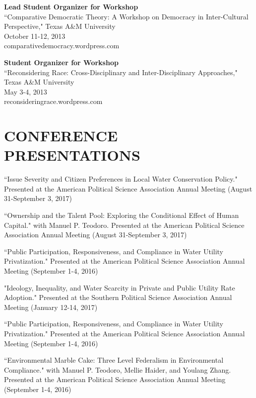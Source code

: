 \documentclass[margin]{res} %
\begin{document}
\begin{resume}
\begin{hangparas}{.25in}{1}
\textbf{Lead Student Organizer for Workshop} \\
``Comparative Democratic Theory: A Workshop on Democracy in Inter-Cultural Perspective," Texas A\&M University\\
October 11-12, 2013 \\
comparativedemocracy.wordpress.com

\textbf{Student Organizer for Workshop} \\
``Reconsidering Race: Cross-Disciplinary and Inter-Disciplinary Approaches," Texas A\&M University\\
May 3-4, 2013 \\
reconsideringrace.wordpress.com \end{hangparas}




\section{CONFERENCE PRESENTATIONS}

 \begin{hangparas}{.25in}{1}

  ``Issue Severity and Citizen Preferences in Local Water Conservation Policy." Presented at the American Political Science Association Annual Meeting (August 31-September 3, 2017)

 ``Ownership and the Talent Pool: Exploring the Conditional Effect of Human Capital." with Manuel P. Teodoro. Presented at the American Political Science Association Annual Meeting (August 31-September 3, 2017)
 
  ``Public Participation, Responsiveness, and Compliance in Water Utility Privatization." Presented at the American Political Science Association Annual Meeting (September 1-4, 2016)

"Ideology, Inequality, and Water Scarcity in Private and Public Utility Rate Adoption." Presented at the Southern Political Science Association Annual Meeting (January 12-14, 2017)

 ``Public Participation, Responsiveness, and Compliance in Water Utility Privatization." Presented at the American Political Science Association Annual Meeting (September 1-4, 2016)

 ``Environmental Marble Cake: Three Level Federalism in Environmental Compliance." with Manuel P. Teodoro, Mellie Haider, and Youlang Zhang. Presented at the American Political Science Association Annual Meeting (September 1-4, 2016)


\end{hangparas}
\end{resume}
\end{document}
